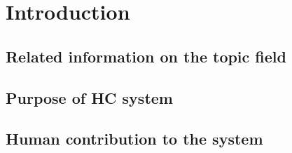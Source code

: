 \section{Introduction}
\subsection{Related information on the topic field}
\subsection{Purpose of HC system}
\subsection{Human contribution to the system}
